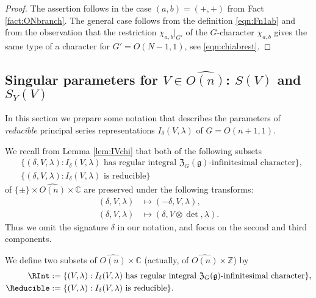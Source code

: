 \begin{proof}
The assertion follows 
 in the case $(a,b)=(+,+)$ from Fact \ref{fact:ONbranch}.  
The general case follows from the definition \eqref{eqn:Fn1ab}
 and from the observation 
 that the restriction $\chi_{a,b}|_{G'}$
 of the $G$-character $\chi_{a,b}$
 gives the same type of a character for $G'=O(N-1,1)$, 
 see \eqref{eqn:chiabrest}. 
\end{proof}

\subsection{Singular parameters for $V \in \widehat{O(n)}$: $S(V)$ and $S_Y(V)$}

In this section we prepare some notation 
 that describes the parameters
 of {\it{reducible}} principal series representations $I_{\delta}(V,\lambda)$
 of $G=O(n+1,1)$.  



We recall from Lemma \ref{lem:IVchi}
 that both of the following subsets
\begin{align*}
&\{(\delta,V,\lambda)
:
\text{$I_{\delta}(V,\lambda)$ has regular integral ${\mathfrak{Z}}_G({\mathfrak{g}})$-infinitesimal character}
\}, 
\\
&\{(\delta,V,\lambda)
:
\text{$I_{\delta}(V,\lambda)$ is reducible}
\}
\end{align*}
 of $\{\pm\} \times \widehat {O(n)} \times {\mathbb{C}}$
 are preserved under the following transforms:
\begin{align*}
  (\delta,V,\lambda) &\mapsto (-\delta,V,\lambda), 
\\
    (\delta,V,\lambda) &\mapsto (\delta,V \otimes \det,\lambda).  
\end{align*}
Thus we omit 
 the signature $\delta$
 in our notation,
 and focus on the second and third components.  

\begin{definition}
\label{def:RIntRed}
We define two subsets
 of $\widehat {O(n)} \times {\mathbb{C}}$
 (actually, of $\widehat{O(n)} \times {\mathbb{Z}}$)
 by 
\begin{align}
\RInt
&:=\{(V,\lambda)
:
\text{$I_{\delta}(V,\lambda)$ has regular integral ${\mathfrak{Z}}_G({\mathfrak{g}})$-infinitesimal character}\}, 
\notag
\\
\label{eqn:reducible}
\Reducible
&:=\{(V,\lambda)
:
\text{$I_{\delta}(V,\lambda)$ is reducible}\}.  
\end{align}
\end{definition}

